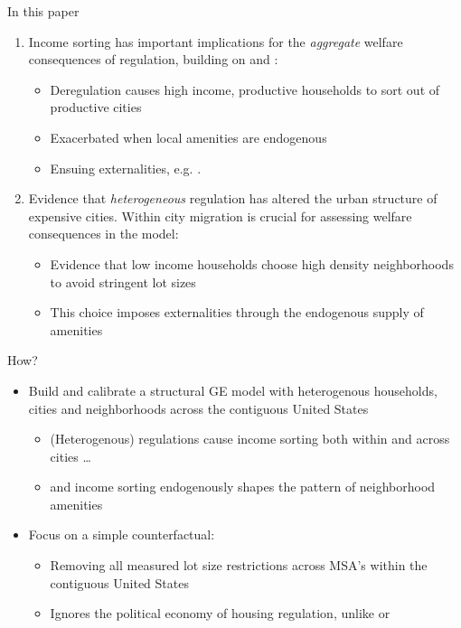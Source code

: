 \documentclass{beamer}
\begin{document}
\begin{frame}{In this paper}
	\begin{enumerate}
		\itemsep1em
		\color{black}
		\item Income sorting has important implications for the \textit{aggregate} welfare consequences of regulation, building on \cite{hseihmoretti} and \cite{durantonpugaurbgrowth}:
		\begin{itemize}
			\item Deregulation causes high income, productive households to sort out of productive cities
			\item Exacerbated when local amenities are endogenous
			\item Ensuing externalities, e.g. \cite{hamilton1976}. 
		\end{itemize} \pause
		\item  Evidence that \textit{heterogeneous} regulation has altered the urban structure of expensive cities. Within city migration is crucial for assessing welfare consequences in the model:
		\begin{itemize}
		\item Evidence that low income households choose high density neighborhoods to avoid stringent lot sizes
		
		\item This choice imposes externalities through the endogenous supply of amenities
		\end{itemize}
	\end{enumerate} 
\end{frame}

\begin{frame}{How?}
	\begin{itemize}
		\color{black}
		\itemsep1em
		\item Build and calibrate a structural GE model with heterogenous households, cities and neighborhoods across the contiguous United States
		\begin{itemize}
			\color{black}
			\itemsep1em
			\item (Heterogenous) regulations cause income sorting both \color{red} within \color{black} and  \color{red} across \color{black} cities \dots
			\item and income sorting endogenously shapes the pattern of neighborhood amenities 
		\end{itemize}
	\pause
		\item Focus on a simple counterfactual:
		\begin{itemize}
			\itemsep1em
			\color{black}
			\item Removing all measured lot size restrictions across MSA's within the contiguous United States \pause
			\item Ignores the political economy of housing regulation, unlike \cite{parkho} or \cite{bunten}  
		\end{itemize}
	\end{itemize}
\end{frame}
\end{document}

